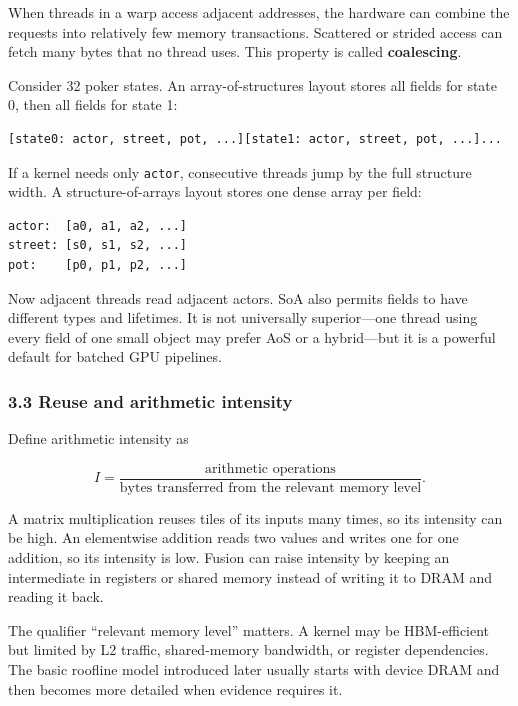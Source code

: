 \documentclass[
  10pt,
  letterpaper,
]{article}
\begin{document}
When threads in a warp access adjacent addresses, the hardware can
combine the requests into relatively few memory transactions. Scattered
or strided access can fetch many bytes that no thread uses. This
property is called \textbf{coalescing}.

Consider 32 poker states. An array-of-structures layout stores all
fields for state 0, then all fields for state 1:

\begin{verbatim}
[state0: actor, street, pot, ...][state1: actor, street, pot, ...]...
\end{verbatim}

If a kernel needs only \texttt{actor}, consecutive threads jump by the
full structure width. A structure-of-arrays layout stores one dense
array per field:

\begin{verbatim}
actor:  [a0, a1, a2, ...]
street: [s0, s1, s2, ...]
pot:    [p0, p1, p2, ...]
\end{verbatim}

Now adjacent threads read adjacent actors. SoA also permits fields to
have different types and lifetimes. It is not universally superior---one
thread using every field of one small object may prefer AoS or a
hybrid---but it is a powerful default for batched GPU pipelines.

\subsubsection{3.3 Reuse and arithmetic
intensity}\label{33-reuse-and-arithmetic-intensity}

Define arithmetic intensity as

\[
I=\frac{\text{arithmetic operations}}{\text{bytes transferred from the relevant memory level}}.
\]

A matrix multiplication reuses tiles of its inputs many times, so its
intensity can be high. An elementwise addition reads two values and
writes one for one addition, so its intensity is low. Fusion can raise
intensity by keeping an intermediate in registers or shared memory
instead of writing it to DRAM and reading it back.

The qualifier ``relevant memory level'' matters. A kernel may be
HBM-efficient but limited by L2 traffic, shared-memory bandwidth, or
register dependencies. The basic roofline model introduced later usually
starts with device DRAM and then becomes more detailed when evidence
requires it.
\end{document}
